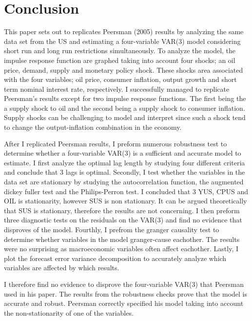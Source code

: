 \documentclass[11pt,preprint, authoryear]{elsarticle}
\numberwithin{equation}{section}
\numberwithin{figure}{section}
\numberwithin{table}{section}
\begin{document}
\hypertarget{conclusion}{%
\section{Conclusion}\label{conclusion}}

This paper sets out to replicates Peersman (2005) results by analyzing
the same data set from the US and estimating a four-variable VAR(3)
model considering short run and long run restrictions simultaneously. To
analyze the model, the impulse response function are graphed taking into
account four shocks; an oil price, demand, supply and monetary policy
shock. These shocks area associated with the four variables; oil price,
consumer inflation, output growth and short term nominal interest rate,
respectively. I successfully managed to replicate Peersman's results
except for two impulse response functions. The first being the a supply
shock to oil and the second being a supply shock to consumer inflation.
Supply shocks can be challenging to model and interpret since such a
shock tend to change the output-inflation combination in the economy.

After I replicated Peersman results, I preform numerous robustness test
to determine whether a four-variable VAR(3) is a sufficient and accurate
model to estimate. I first analyze the optimal lag length by studying
four different criteria and conclude that 3 lags is optimal. Secondly, I
test whether the variables in the data set are stationary by studying
the autocorrelation function, the augmented dickey fuller test and the
Philips-Perron test. I concluded that 3 YUS, CPUS and OIL is
stationarity, however SUS is non stationary. It can be argued
theoretically that SUS is stationary, therefore the results are not
concerning. I then preform three diagnostic tests on the residuals on
the VAR(3) and find no evidence that disproves of the model. Fourthly, I
prefrom the granger causality test to determine whether variables in the
model granger-cause eachother. The results were no surprising as
macroeconomic variables often affect eachother. Lastly, I plot the
forecast error variance decomposition to accurately analyze which
variables are affected by which results.

I therefore find no evidence to disprove the four-variable VAR(3) that
Peersman used in his paper. The results from the robustness checks prove
that the model is accurate and robust. Peersman correctly specified his
model taking into account the non-stationarity of one of the variables.
\end{document}
